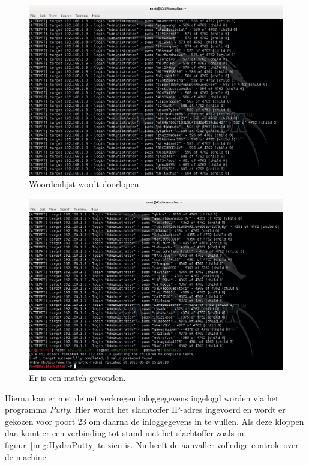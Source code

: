 \documentclass[pdftex,a4paper,12pt]{report}
\begin{document}
\begin{figure}[H]
\begin{center}
\includegraphics[scale=0.40]{img/HydraAanval}
\end{center}
\caption{Woordenlijst wordt doorlopen.}
\label{img:HydraAanval}
\end{figure}

\begin{figure}[H]
\begin{center}
\includegraphics[scale=0.40]{img/HydraGeslaagd}
\end{center}
\caption{Er is een match gevonden.}
\label{img:HydraGeslaagd}
\end{figure}

Hierna kan er met de net verkregen inloggegevens ingelogd worden via het programma \textit{Putty}. Hier wordt het slachtoffer IP-adres ingevoerd en wordt er gekozen voor poort 23 om daarna de inloggegevens in te vullen. Als deze kloppen dan komt er een verbinding tot stand met het slachtoffer zoals in figuur~\ref{img:HydraPutty} te zien is. Nu heeft de aanvaller volledige controle over de machine.
\end{document}

